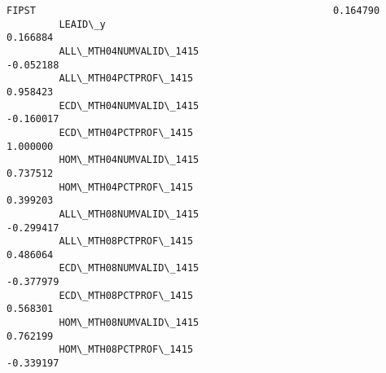 \documentclass[11pt]{article}
\begin{document}
\begin{Verbatim}[commandchars=\\\{\}]
         FIPST                                                   0.164790   
         LEAID\_y                                                 0.166884   
         ALL\_MTH04NUMVALID\_1415                                 -0.052188   
         ALL\_MTH04PCTPROF\_1415                                   0.958423   
         ECD\_MTH04NUMVALID\_1415                                 -0.160017   
         ECD\_MTH04PCTPROF\_1415                                   1.000000   
         HOM\_MTH04NUMVALID\_1415                                  0.737512   
         HOM\_MTH04PCTPROF\_1415                                   0.399203   
         ALL\_MTH08NUMVALID\_1415                                 -0.299417   
         ALL\_MTH08PCTPROF\_1415                                   0.486064   
         ECD\_MTH08NUMVALID\_1415                                 -0.377979   
         ECD\_MTH08PCTPROF\_1415                                   0.568301   
         HOM\_MTH08NUMVALID\_1415                                  0.762199   
         HOM\_MTH08PCTPROF\_1415                                  -0.339197   
         

\end{Verbatim}
\end{document}
